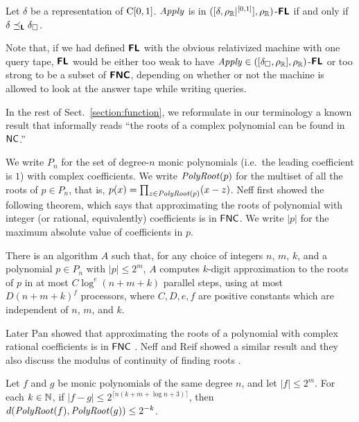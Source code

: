 \documentclass[a4paper,UKenglish]{lipics}
\begin{document}
\begin{theorem}
 \label{theorem:apply-is-L-computable}
 Let $\delta$ be a representation of $\mathrm C[0, 1]$.
 $\mathit{Apply}$ is in $([\delta, \rho _\mathbb R|^{[0,1]}], \rho _\mathbb R)$-$\text{\bfseries \sffamily \upshape FL}$ if
 and only if $\delta \preceq_{\text{\bfseries \sffamily \upshape L}} \delta _\square$.
\end{theorem}

Note that, 
if we had defined $\text{\bfseries \sffamily \upshape FL}$ with the obvious relativized machine with one query tape,
$\text{\bfseries \sffamily \upshape FL}$ would be either too weak 
to have $\mathit{Apply} \in ([\delta _\square,\rho _\mathbb R], \rho _\mathbb R)$-$\text{\bfseries \sffamily \upshape FL}$ or
too strong to be a subset of $\text{\bfseries \sffamily \upshape FNC}$,
depending on whether or not the machine is allowed to look at the answer tape while writing queries.

In the rest of Sect.~\ref{section:function}, 
we reformulate in our terminology a known result that 
informally reads
``the roots of a complex polynomial can be found in $\mathsf{NC}$.'' 

We write $P_n$ for the set of degree-$n$ monic 
polynomials (i.e.\ the leading coefficient is $1$) with complex coefficients.
We write $\mathit{PolyRoot}(p)$ for the multiset of all the roots of $p \in P_n$, that is, $p(x) = \prod_{z \in \mathit{PolyRoot}(p)} (x - z)$. 
Neff first showed the following theorem, which says that 
approximating the roots of polynomial
with integer (or rational, equivalently) coefficients is in $\mathsf{FNC}$.
We write $|p|$ for the maximum absolute value of coefficients in $p$.

\begin{theorem}
\label{theorem:neff1994}
There is an algorithm $A$ such that,
for any choice of integers $n$, $m$, $k$, and a polynomial $p \in P_n$
with $|p| \le 2^m$,
$A$ computes $k$-digit approximation to the roots of $p$ 
in at most $C \log^e(n + m + k)$ parallel steps, 
using at most $D(n + m + k)^f$ processors, where $C, D, e, f$ are positive
constants which are independent of $n$, $m$, and $k$.
\end{theorem}

Later Pan showed that approximating the roots of a polynomial
with complex rational coefficients is in $\mathsf{FNC}$ \cite{pan1995optimal}.
Neff and Reif showed a similar result and they also discuss
the modulus of continuity of finding roots \cite{neff1996efficient}.

\begin{theorem}
\label{neff1996modulus}
 Let $f$ and $g$ be monic polynomials of the same degree $n$,
 and let $|f| \le 2^m$.
 For each $k \in \mathbb N$, 
 if $|f - g| \le 2^{\lceil n(k + m + \log n + 3)\rceil}$, then
 $d(\mathit{PolyRoot}(f), \mathit{PolyRoot}(g)) \le 2^{-k}$. 
\end{theorem}
\end{document}
